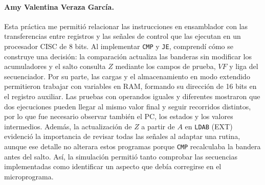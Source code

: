 \documentclass[letterpaper,12pt]{article}
\begin{document}
\paragraph{Amy Valentina Veraza García.} Esta práctica me permitió relacionar las instrucciones en ensamblador con las transferencias entre registros y las señales de control que las ejecutan en un procesador CISC de 8 bits. Al implementar \texttt{CMP} y \texttt{JE}, comprendí cómo se construye una decisión: la comparación actualiza las banderas sin modificar los acumuladores y el salto consulta $Z$ mediante los campos de prueba, $VF$ y liga del secuenciador. Por su parte, las cargas y el almacenamiento en modo extendido permitieron trabajar con variables en RAM, formando su dirección de 16 bits en el registro auxiliar. Las pruebas con operandos iguales y diferentes mostraron que dos ejecuciones pueden llegar al mismo valor final y seguir recorridos distintos, por lo que fue necesario observar también el PC, los estados y los valores intermedios. Además, la actualización de $Z$ a partir de $A$ en \texttt{LDAB} (EXT) evidenció la importancia de revisar todas las señales al adaptar una rutina, aunque ese detalle no alterara estos programas porque \texttt{CMP} recalculaba la bandera antes del salto. Así, la simulación permitió tanto comprobar las secuencias implementadas como identificar un aspecto que debía corregirse en el microprograma.
\end{document}
